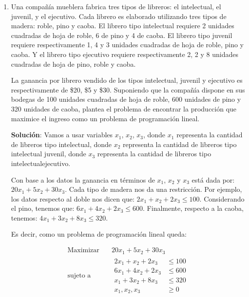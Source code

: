 \documentclass[twocolumn]{article}
\begin{document}
\begin{enumerate}
\item Una compañía mueblera fabrica tres tipos de libreros: el
\guillemotleft{}intelectual\guillemotright{}, el \guillemotleft{}juvenil\guillemotright{}, y el \guillemotleft{}ejecutivo\guillemotright{}. Cada librero es
elaborado utilizando tres tipos de madera: roble, pino y caoba. El
librero tipo \guillemotleft{}intelectual\guillemotright{} requiere 2 unidades cuadradas de hoja de
roble, 6 de pino y 4 de caoba. El librero tipo \guillemotleft{}juvenil\guillemotright{} requiere
respectivamente 1, 4 y 3 unidades cuadradas de hoja de roble, pino
y caoba. Y el librero tipo \guillemotleft{}ejecutivo\guillemotright{} requiere respectivamente 2,
2 y 8 unidades cuadradas de hoja de pino, roble y caoba.

La ganancia por librero vendido de los tipos \guillemotleft{}intelectual\guillemotright{},
\guillemotleft{}juvenil\guillemotright{} y \guillemotleft{}ejecutivo\guillemotright{} es respectivamente de \$20, \$5 y
\$30. Suponiendo que la compañía dispone en sus bodegas de 100
unidades cuadradas de hoja de roble, 600 unidades de pino y 320
unidades de caoba, plantea el problema de encontrar la producción
que maximice el ingreso como un problema de programación lineal.

\textbf{Solución}: Vamos a usar variables $x_1$, $x_2$, $x_3$, donde $x_1$ representa la cantidad de libreros tipo intelectual, donde $x_2$ representa la cantidad de libreros tipo intelectual juvenil, donde $x_3$ representa la cantidad de libreros tipo intelectualejecutivo.

Con base a los datos la ganancia en términos de $x_1$, $x_2$ y $x_3$ está dada por: $20x_1+5x_2+30x_3$. Cada tipo de madera nos da una restricción. Por ejemplo, los datos respecto al doble nos dicen que: $2x_1+x_2+2x_3\leq 100$. Considerando el pino, tenemos que: $6x_1+4x_2+2x_3\leq 600$. Finalmente, respecto a la caoba, tenemos: $4x_1+3x_2+8x_3\leq 320$.

Es decir, como un problema de programación lineal queda:

\begin{equation*}
 \begin{aligned}
\text{Maximizar} \quad & 20x_1+5x_2+30x_3\\
\text{sujeto a} \quad &
  \begin{aligned}
  2x_1+x_2+2x_3 &\leq 100\\
  6x_1+4x_2+2x_3 &\leq 600\\
  x_1+3x_2+8x_3 &\leq 320\\
    x_{1},x_{2},x_3 &\geq 0
  \end{aligned}
\end{aligned}
\end{equation*}


\end{enumerate}
\end{document}

